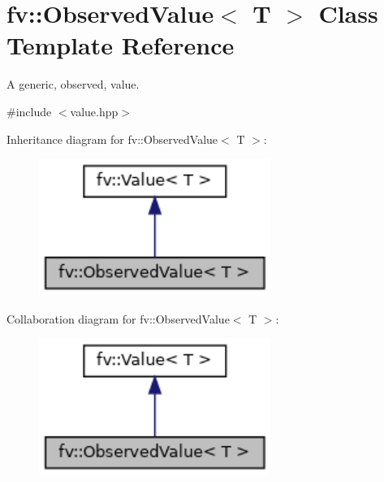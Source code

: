 \hypertarget{classfv_1_1ObservedValue}{}\section{fv\+:\+:Observed\+Value$<$ T $>$ Class Template Reference}
\label{classfv_1_1ObservedValue}


A generic, observed, value.  




{\ttfamily \#include $<$value.\+hpp$>$}



Inheritance diagram for fv\+:\+:Observed\+Value$<$ T $>$\+:
\nopagebreak
\begin{figure}[H]
\begin{center}
\leavevmode
\includegraphics[width=214pt]{classfv_1_1ObservedValue__inherit__graph}
\end{center}
\end{figure}


Collaboration diagram for fv\+:\+:Observed\+Value$<$ T $>$\+:
\nopagebreak
\begin{figure}[H]
\begin{center}
\leavevmode
\includegraphics[width=214pt]{classfv_1_1ObservedValue__coll__graph}
\end{center}
\end{figure}
